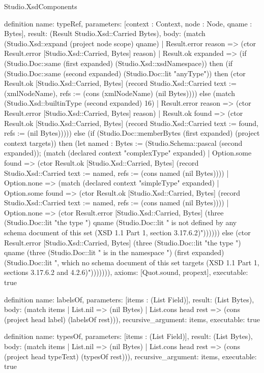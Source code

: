 \begin{lexlean}{Studio.XsdComponents}
\begin{semanticmodule}
definition{
  name: typeRef,
  parameters: [context : Context, node : Node, qname : Bytes],
  result: (Result Studio.Xsd::Carried Bytes),
  body: (match (Studio.Xsd::expand (project node scope) qname)
    | Result.error reason => (ctor Result.error [Studio.Xsd::Carried, Bytes] reason)
    | Result.ok expanded => (if (Studio.Doc::same (first expanded) (Studio.Xsd::xsdNamespace)) then (if (Studio.Doc::same (second expanded) (Studio.Doc::lit "anyType")) then (ctor Result.ok [Studio.Xsd::Carried, Bytes] (record Studio.Xsd::Carried {text := (xmlNodeName), refs := (cons (xmlNodeName) (nil Bytes))})) else (match (Studio.Xsd::builtinType (second expanded) 16)
      | Result.error reason => (ctor Result.error [Studio.Xsd::Carried, Bytes] reason)
      | Result.ok found => (ctor Result.ok [Studio.Xsd::Carried, Bytes] (record Studio.Xsd::Carried {text := found, refs := (nil Bytes)})))) else (if (Studio.Doc::memberBytes (first expanded) (project context targets)) then (let named : Bytes := (Studio.Schema::pascal (second expanded)); (match (declared context "complexType" expanded)
      | Option.some found => (ctor Result.ok [Studio.Xsd::Carried, Bytes] (record Studio.Xsd::Carried {text := named, refs := (cons named (nil Bytes))}))
      | Option.none => (match (declared context "simpleType" expanded)
        | Option.some found => (ctor Result.ok [Studio.Xsd::Carried, Bytes] (record Studio.Xsd::Carried {text := named, refs := (cons named (nil Bytes))}))
        | Option.none => (ctor Result.error [Studio.Xsd::Carried, Bytes] (three (Studio.Doc::lit "the type ") qname (Studio.Doc::lit " is not defined by any schema document of this set (XSD 1.1 Part 1, section 3.17.6.2)")))))) else (ctor Result.error [Studio.Xsd::Carried, Bytes] (three (Studio.Doc::lit "the type ") qname (three (Studio.Doc::lit " is in the namespace ") (first expanded) (Studio.Doc::lit ", which no schema document of this set targets (XSD 1.1 Part 1, sections 3.17.6.2 and 4.2.6)"))))))),
  axioms: [Quot.sound, propext],
  executable: true
}

definition{
  name: labelsOf,
  parameters: [items : (List Field)],
  result: (List Bytes),
  body: (match items
    | List.nil => (nil Bytes)
    | List.cons head rest => (cons (project head label) (labelsOf rest))),
  recursive_argument: items,
  executable: true
}

definition{
  name: typesOf,
  parameters: [items : (List Field)],
  result: (List Bytes),
  body: (match items
    | List.nil => (nil Bytes)
    | List.cons head rest => (cons (project head typeText) (typesOf rest))),
  recursive_argument: items,
  executable: true
}


\end{semanticmodule}
\end{lexlean}
